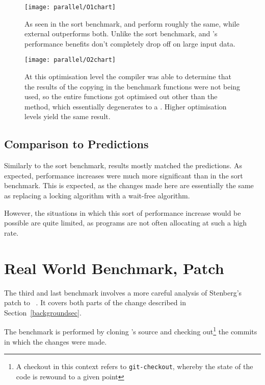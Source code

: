 \begin{figure}[p]
	\centering
	\texttt{[image: parallel/O1chart]}
	\caption{As seen in the sort benchmark,  and  perform roughly the same, while external outperforms both. Unlike the sort benchmark,  and 's performance benefits don't completely drop off on large input data.}
\end{figure}

\begin{figure}[p]
	\centering
	\texttt{[image: parallel/O2chart]}
	\caption{At this optimisation level the compiler was able to determine that the results of the copying in the benchmark functions were not being used, so the entire functions got optimised out other than the  method, which essentially degenerates to a . Higher optimisation levels yield the same result.}\label{lastparallel}
\end{figure}

\subsection{Comparison to Predictions}

Similarly to the sort benchmark, results mostly matched the predictions. As expected, performance increases were much more significant than in the sort benchmark. This is expected, as the changes made here are essentially the same as replacing a locking algorithm with a wait-free algorithm.

However, the situations in which this sort of performance increase would be possible are quite limited, as programs are not often allocating at such a high rate.

\pagebreak

\section{Real World Benchmark,  Patch}

The third and last benchmark involves a more careful analysis of Stenberg's patch to ~\cite{curlmalloc}. It covers both parts of the change described in Section~\ref{backgroundsec}.

The benchmark is performed by cloning 's source and checking out\footnote{A checkout in this context refers to \texttt{git-checkout}, whereby the state of the code is rewound to a given point} the commits in which the changes were made.

